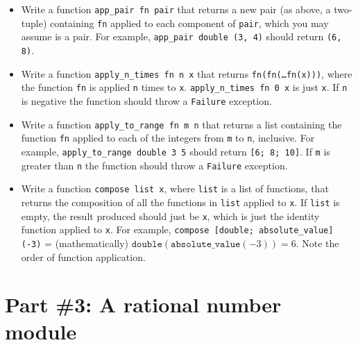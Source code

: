 \documentclass[11pt]{article}
\begin{document}
    \begin{itemize}

      \addtolength{\itemsep}{-1mm}

      \item Write a function \texttt{app\_pair fn pair} that returns a new
            pair (as above, a two-tuple) containing \texttt{fn} applied to
            each component of \texttt{pair}, which you may assume is a pair.
            For example, \texttt{app\_pair double (3, 4)} should return
            \texttt{(6, 8)}.

      \item Write a function \texttt{apply\_n\_times fn n x} that returns
            \texttt{fn(fn(\textrm{\ldots}fn(x)))}, where the function
            \texttt{fn} is applied \texttt{n} times to \texttt{x}.
            \texttt{apply\_n\_times fn 0 x} is just \texttt{x}.  If
            \texttt{n} is negative the function should throw a
            \texttt{Failure} exception.

      \item Write a function \texttt{apply\_to\_range fn m n} that returns a
            list containing the function \texttt{fn} applied to each of the
            integers from \texttt{m} to \texttt{n}, inclusive.  For example,
            \texttt{apply\_to\_range double 3 5} should return \texttt{[6;
            8; 10]}.  If \texttt{m} is greater than \texttt{n} the
            function should throw a \texttt{Failure} exception.

      \item Write a function \texttt{compose list x}, where \texttt{list} is
            a list of functions, that returns the composition of all the
            functions in \texttt{list} applied to \texttt{x}.  If
            \texttt{list} is empty, the result produced should just be
            \texttt{x}, which is just the identity function applied to
            \texttt{x}.  For example, \texttt{compose [double;
            absolute\_value] (-3)} = (mathematically)
            $\mathtt{double}(\mathtt{absolute\_value}(-3)) = 6$.  Note the
            order of function application.

    \end{itemize}

    \vspace{-4.5mm}

  \section{Part \#3: A rational number module}
\end{document}
